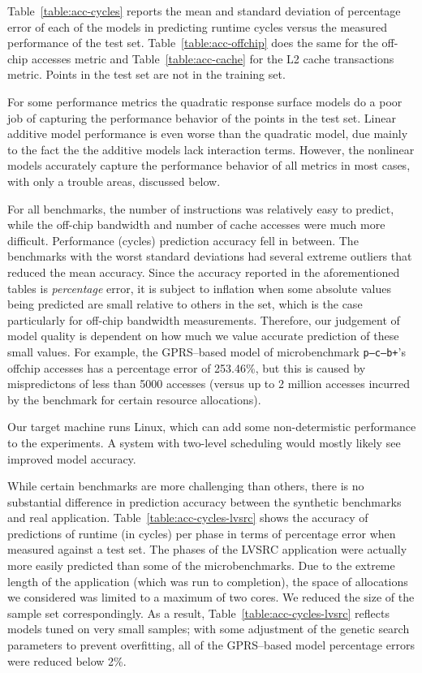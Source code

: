 Table~\ref{table:acc-cycles} reports the mean and standard deviation of percentage error of each of the models in predicting runtime cycles versus the measured performance of the test set. Table~\ref{table:acc-offchip} does the same for the off-chip accesses metric and Table~\ref{table:acc-cache} for the L2 cache transactions metric.  Points in the test set are not in the training set.

For some performance metrics the quadratic response surface models do a poor job of capturing the performance behavior of the points in the test set.  Linear additive model performance is even worse than the quadratic model, due mainly to the fact the the additive models lack interaction terms. However, the nonlinear models accurately capture the performance behavior of all metrics in most cases, with only a trouble areas, discussed below.

For all benchmarks, the number of instructions was relatively easy to predict, while the off-chip bandwidth and number of cache accesses were much more difficult.  Performance (cycles) prediction accuracy fell in between.  The benchmarks with the worst standard deviations had several extreme outliers that reduced the mean accuracy. Since the accuracy reported in the aforementioned tables is {\em percentage} error, it is subject to inflation when some absolute values being predicted are small relative to others in the set, which is the case particularly for off-chip bandwidth measurements.  Therefore, our judgement of model quality is dependent on how much we value accurate prediction of these small values.  For example, the GPRS--based model of microbenchmark {\tt  p--c--b+}'s offchip accesses has a percentage error of 253.46\%, but this is caused by mispredictons of less than 5000 accesses (versus up to 2 million accesses incurred by the benchmark for certain resource allocations). 

Our target machine runs Linux, which can add some non-determistic performance to the experiments.  A system with two-level scheduling would mostly likely see improved model accuracy.  

While certain benchmarks are more challenging than others, there is no substantial difference in prediction accuracy between the synthetic benchmarks and real application. Table~\ref{table:acc-cycles-lvsrc} shows the accuracy of predictions of runtime (in cycles) per phase in terms of percentage error when measured against a test set.  The phases of the LVSRC application were actually more easily predicted than some of the microbenchmarks.  Due to the extreme length of the application (which was run to completion), the space of allocations we considered was limited to a maximum of two cores.  We reduced the size of the sample set correspondingly.  As a result, Table~\ref{table:acc-cycles-lvsrc} reflects models tuned on very small samples; with some adjustment of the genetic search parameters to prevent overfitting, all of the GPRS--based model percentage errors were reduced below 2\%.

